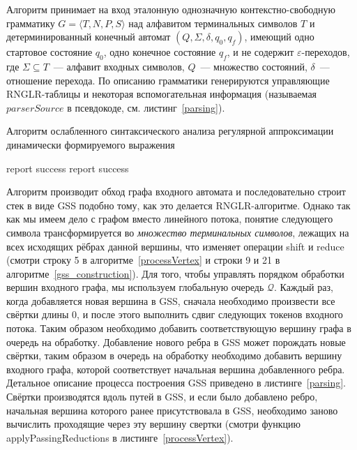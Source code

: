 Алгоритм принимает на вход эталонную однозначную контекстно-свободную грамматику $G=\langle T, N, P, S \rangle$ над алфавитом терминальных символов $T$ и детерминированный конечный автомат $(Q,\Sigma,\delta,q_0,q_f)$, имеющий одно стартовое состояние $q_0$, одно конечное состояние $q_f$, и не содержит $\varepsilon$-переходов, где $\Sigma \subseteq T$~--- алфавит входных символов, $Q$~--- множество состояний, $\delta$~--- отношение перехода. По описанию  грамматики генерируются управляющие RNGLR-таблицы и некоторая вспомогательная информация (называемая $parserSource$ в псевдокоде, см. листинг~\ref{parsing}). 

\begin{algorithm}[!ht]
\begin{algorithmic}[1]
\caption{Алгоритм ослабленного синтаксического анализа регулярной аппроксимации динамически формируемого выражения}
\label{parsing}
     {report success}
    \EndIf
  \Else
    \EndWhile
     {report success}
    \EndIf
  \EndIf
\EndFunction
\end{algorithmic}
\end{algorithm}

Алгоритм производит обход графа входного автомата и последовательно строит стек в виде GSS подобно тому, как это делается RNGLR-алгоритме. Однако так как мы имеем дело с графом вместо линейного потока, понятие следующего символа трансформируется во \emph{множество терминальных символов}, лежащих на всех исходящих рёбрах данной вершины, что изменяет операции shift и reduce (смотри строку 5 в алгоритме~\ref{processVertex} и строки 9 и 21 в алгоритме~\ref{gss_construction}). Для того, чтобы управлять порядком обработки вершин входного графа, мы используем глобальную очередь $\mathcal{Q}$. Каждый раз, когда добавляется новая вершина в GSS, сначала необходимо произвести все свёртки длины 0, и после этого выполнить сдвиг следующих токенов входного потока. Таким образом необходимо добавить соответствующую вершину графа в очередь на обработку. Добавление нового ребра в GSS может порождать новые свёртки, таким образом в очередь на обработку необходимо добавить вершину входного графа, которой соответствует начальная вершина добавленного ребра. Детальное описание процесса построения GSS приведено в листинге~\ref{parsing}. Свёртки производятся вдоль путей в GSS, и если было добавлено ребро, начальная вершина которого ранее присутствовала в GSS, необходимо заново вычислить проходящие через эту вершину свертки (смотри функцию applyPassingReductions в листинге~\ref{processVertex}).


